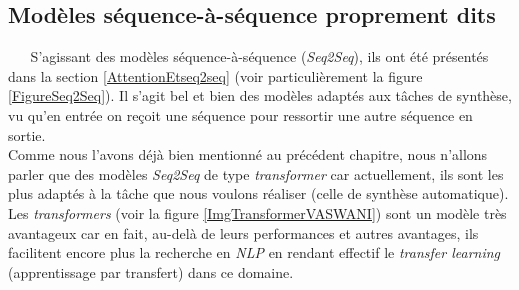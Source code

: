 \subsection{Modèles séquence-à-séquence proprement dits}
$ _{} $ $ _{} $ $ _{} $ $ _{} $ $ _{} $S'agissant des modèles séquence-à-séquence (\textit{Seq2Seq}), ils ont été présentés dans la section \ref{AttentionEtseq2seq} (voir particulièrement la figure \ref{FigureSeq2Seq}). Il s'agit bel et bien des modèles adaptés aux tâches de synthèse, vu qu'en entrée on reçoit une séquence pour ressortir une autre séquence en sortie.\\
Comme nous l'avons déjà bien mentionné au précédent chapitre, nous n'allons parler que des modèles \textit{Seq2Seq} de type \textit{transformer} car actuellement, ils sont les plus adaptés à la tâche que nous voulons réaliser (celle de synthèse automatique). Les \textit{transformers} (voir la figure \ref{ImgTransformerVASWANI}) sont un modèle très avantageux car en fait, au-delà de leurs performances et autres avantages, ils facilitent encore plus la recherche en \textit{NLP} en rendant effectif le \textit{transfer learning} (apprentissage par transfert) dans ce domaine.\\

